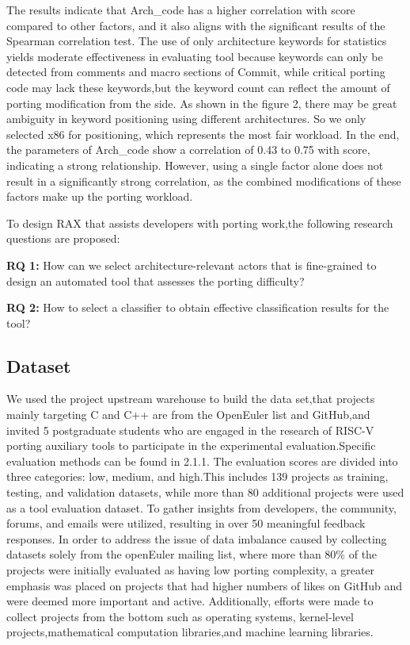 \documentclass[sigconf,screen,review,anonymous]{acmart}
\begin{document}
The results indicate that Arch\_code has a higher correlation with score compared to other factors, and it also aligns with the significant results of the Spearman correlation test.
The use of only architecture keywords for statistics yields moderate effectiveness in evaluating tool because keywords can only be detected from comments and macro sections of Commit, while critical porting code may lack these keywords,but the keyword count can reflect the amount of porting modification from the side.
As shown in the figure 2, there may be great ambiguity in keyword positioning using different architectures.
So we only selected x86 for positioning, which represents the most fair workload.
In the end, the parameters of Arch\_code show a correlation of 0.43 to 0.75 with score, indicating a strong relationship.
However, using a single factor alone does not result in a significantly strong correlation, as the combined modifications of these factors make up the porting workload.

To design RAX that assists developers with porting work,the following research questions are proposed:

\textbf{RQ 1:} How can we select architecture-relevant actors that is fine-grained to design an automated tool that assesses the porting difficulty?

\textbf{RQ 2:} How to select a classifier to obtain effective classification results for the tool?


\subsection{Dataset}
We used the project upstream warehouse to build the data set,that projects mainly targeting C and C++ are from the OpenEuler\citep{stage2023} list and GitHub,and invited 5 postgraduate students who are engaged in the research of RISC-V porting auxiliary tools to participate in the experimental evaluation.Specific evaluation methods can be found in 2.1.1. The evaluation scores are divided into three categories: low, medium, and high\citep{githuburl}.This includes 139 projects as training, testing, and validation datasets, while more than 80 additional projects were used as a tool evaluation dataset. To gather insights from developers, the community, forums, and emails were utilized, resulting in over 50 meaningful feedback responses. In order to address the issue of data imbalance caused by collecting datasets solely from the openEuler mailing list, where more than 80\% of the projects were initially evaluated as having low porting complexity, a greater emphasis was placed on projects that had higher numbers of likes on GitHub and were deemed more important and active. Additionally, efforts were made to collect projects from the bottom such as operating systems, kernel-level projects,mathematical computation libraries,and machine learning libraries.
\end{document}
